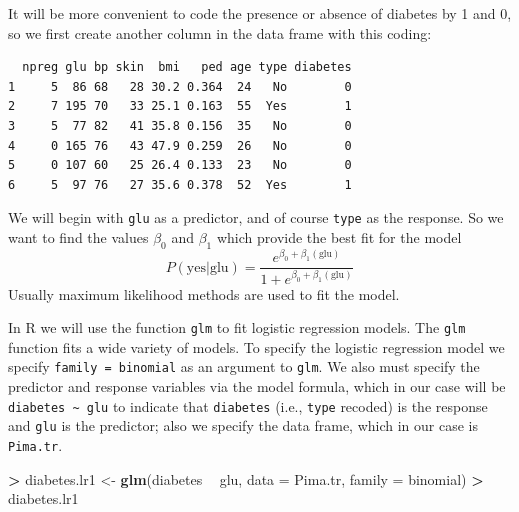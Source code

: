 \documentclass[]{krantz}
\makeatletter
\newenvironment{Shaded}{\begin{snugshade}}{\end{snugshade}}
\newcommand{\DataTypeTok}[1]{\textcolor[rgb]{0.27,0.27,0.27}{#1}}
\newcommand{\DecValTok}[1]{\textcolor[rgb]{0.06,0.06,0.06}{#1}}
\newcommand{\KeywordTok}[1]{\textcolor[rgb]{0.27,0.27,0.27}{\textbf{#1}}}
\newcommand{\NormalTok}[1]{#1}
\newcommand{\OperatorTok}[1]{\textcolor[rgb]{0.43,0.43,0.43}{\textbf{#1}}}
\newcommand{\StringTok}[1]{\textcolor[rgb]{0.5,0.5,0.5}{#1}}
\newenvironment{kframe}{%
\medskip{}
\setlength{\fboxsep}{.8em}
 \def\at@end@of@kframe{}%
 \ifinner\ifhmode%
  \def\at@end@of@kframe{\end{minipage}}%
  \begin{minipage}{\columnwidth}%
 \fi\fi%
 \def\FrameCommand##1{\hskip\@totalleftmargin \hskip-\fboxsep
 \colorbox{shadecolor}{##1}\hskip-\fboxsep
     \hskip-\linewidth \hskip-\@totalleftmargin \hskip\columnwidth}%
 \MakeFramed {\advance\hsize-\width
   \@totalleftmargin\z@ \linewidth\hsize
   \@setminipage}}%
 {\par\unskip\endMakeFramed%
 \at@end@of@kframe}
\renewenvironment{Shaded}{\begin{kframe}}{\end{kframe}}
\makeatother
\begin{document}
It will be more convenient to code the presence or absence of diabetes by 1 and 0, so we first create another column in the data frame with this coding:

\begin{Shaded}
\end{Shaded}

\begin{verbatim}
  npreg glu bp skin  bmi   ped age type diabetes
1     5  86 68   28 30.2 0.364  24   No        0
2     7 195 70   33 25.1 0.163  55  Yes        1
3     5  77 82   41 35.8 0.156  35   No        0
4     0 165 76   43 47.9 0.259  26   No        0
5     0 107 60   25 26.4 0.133  23   No        0
6     5  97 76   27 35.6 0.378  52  Yes        1
\end{verbatim}

We will begin with \texttt{glu} as a predictor, and of course \texttt{type} as the response. So we want to find the values \(\beta_0\) and \(\beta_1\) which provide the best fit for the model
\[
P(\text{yes} | \text{glu}) = \frac{e^{\beta_0 + \beta_1 (\text{glu})}}{1 + e^{\beta_0 + \beta_1 (\text{glu})}}
\]
Usually maximum likelihood methods are used to fit the model.

In R we will use the function \texttt{glm} to fit logistic regression models. The \texttt{glm} function fits a wide variety of models. To specify the logistic regression model we specify \texttt{family\ =\ binomial} as an argument to \texttt{glm}. We also must specify the predictor and response variables via the model formula, which in our case will be \texttt{diabetes\ \textasciitilde{}\ glu} to indicate that \texttt{diabetes} (i.e., \texttt{type} recoded) is the response and \texttt{glu} is the predictor; also we specify the data frame, which in our case is \texttt{Pima.tr}.

\begin{Shaded}
\begin{Highlighting}[]
\OperatorTok{>}\StringTok{ }\NormalTok{diabetes.lr1 <-}\StringTok{ }\KeywordTok{glm}\NormalTok{(diabetes }\OperatorTok{~}\StringTok{ }\NormalTok{glu, }\DataTypeTok{data =}\NormalTok{ Pima.tr, }\DataTypeTok{family =}\NormalTok{ binomial)}
\OperatorTok{>}\StringTok{ }\NormalTok{diabetes.lr1}
\end{Highlighting}
\end{Shaded}
\end{document}
